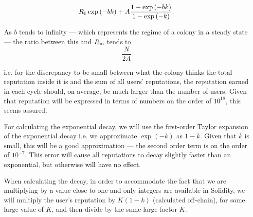 $$R_{\rm 0}\exp\left(-bk\right) + A\frac{1-\exp\left(-bk\right)}{1-\exp\left(-k\right)}.$$

As $b$ tends to infinity --- which represents the regime of a colony in a steady state --- the ratio between this and $R_{\rm m}$ tends to
$$\frac{N}{2A}$$

\noindent i.e. for the discrepancy to be small between what the colony thinks the total reputation inside it is and the sum of all users' reputations, the reputation earned in each cycle should, on average, be much larger than the number of users. Given that reputation will be expressed in terms of numbers on the order of $10^{18}$, this seems assured.

For calculating the exponential decay, we will use the first-order Taylor expansion of the exponential decay i.e. we approximate $\exp\left(-k\right)$ as $1-k$. Given that $k$ is small, this will be a good approximation --- the second order term is on the order of $10^{-7}$. This error will cause all reputations to decay slightly faster than an exponential, but otherwise will have no effect.

When calculating the decay, in order to accommodate the fact that we are multiplying by a value close to one and only integers are available in Solidity, we will multiply the user's reputation by $K(1-k)$ (calculated off-chain), for some large value of $K$, and then divide by the same large factor $K$.
